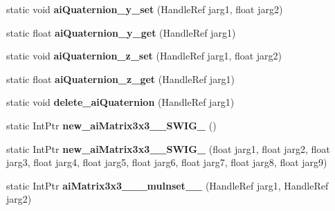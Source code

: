 \begin{DoxyCompactItemize}
\item 
\hypertarget{class_assimp_p_i_n_v_o_k_e_a3817922af6323f163b09a87103172d7f}{static void {\bfseries ai\+Quaternion\+\_\+y\+\_\+set} (Handle\+Ref jarg1, float jarg2)}\label{class_assimp_p_i_n_v_o_k_e_a3817922af6323f163b09a87103172d7f}

\item 
\hypertarget{class_assimp_p_i_n_v_o_k_e_a383bcf03b341a4cae66eb1e7498059b4}{static float {\bfseries ai\+Quaternion\+\_\+y\+\_\+get} (Handle\+Ref jarg1)}\label{class_assimp_p_i_n_v_o_k_e_a383bcf03b341a4cae66eb1e7498059b4}

\item 
\hypertarget{class_assimp_p_i_n_v_o_k_e_ac11b36e25c95be6b840b0e7dc808f940}{static void {\bfseries ai\+Quaternion\+\_\+z\+\_\+set} (Handle\+Ref jarg1, float jarg2)}\label{class_assimp_p_i_n_v_o_k_e_ac11b36e25c95be6b840b0e7dc808f940}

\item 
\hypertarget{class_assimp_p_i_n_v_o_k_e_ac4821ef4f7c1fbd1dcdb1ad824d011c4}{static float {\bfseries ai\+Quaternion\+\_\+z\+\_\+get} (Handle\+Ref jarg1)}\label{class_assimp_p_i_n_v_o_k_e_ac4821ef4f7c1fbd1dcdb1ad824d011c4}

\item 
\hypertarget{class_assimp_p_i_n_v_o_k_e_a0e07eb559ed291e4f04922d1c5db7b99}{static void {\bfseries delete\+\_\+ai\+Quaternion} (Handle\+Ref jarg1)}\label{class_assimp_p_i_n_v_o_k_e_a0e07eb559ed291e4f04922d1c5db7b99}

\item 
\hypertarget{class_assimp_p_i_n_v_o_k_e_ada3d08fa16ea3a1d5de8cd03c7c66e33}{static Int\+Ptr {\bfseries new\+\_\+ai\+Matrix3x3\+\_\+\+\_\+\+S\+W\+I\+G\+\_} ()}\label{class_assimp_p_i_n_v_o_k_e_ada3d08fa16ea3a1d5de8cd03c7c66e33}

\item 
\hypertarget{class_assimp_p_i_n_v_o_k_e_a2c7e6f4a849538d76c111c4ca1dd1b92}{static Int\+Ptr {\bfseries new\+\_\+ai\+Matrix3x3\+\_\+\+\_\+\+S\+W\+I\+G\+\_} (float jarg1, float jarg2, float jarg3, float jarg4, float jarg5, float jarg6, float jarg7, float jarg8, float jarg9)}\label{class_assimp_p_i_n_v_o_k_e_a2c7e6f4a849538d76c111c4ca1dd1b92}

\item 
\hypertarget{class_assimp_p_i_n_v_o_k_e_ac287ae90d551309478886e88ef63784a}{static Int\+Ptr {\bfseries ai\+Matrix3x3\+\_\+\+\_\+\+\_\+mulnset\+\_\+\+\_\+} (Handle\+Ref jarg1, Handle\+Ref jarg2)}\label{class_assimp_p_i_n_v_o_k_e_ac287ae90d551309478886e88ef63784a}


\end{DoxyCompactItemize}
